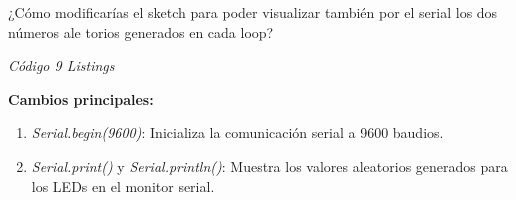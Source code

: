 ¿Cómo modificarías el sketch para poder visualizar también por el serial los dos números ale torios generados en cada loop?

\emph{Código 9 Listings}

\textbf{Cambios principales:}
\begin{enumerate}
  \item \emph{Serial.begin(9600)}: Inicializa la comunicación serial a 9600 baudios.
  \item \emph{Serial.print()} y \emph{Serial.println()}: Muestra los valores aleatorios generados para los LEDs en el monitor serial.
\end{enumerate}